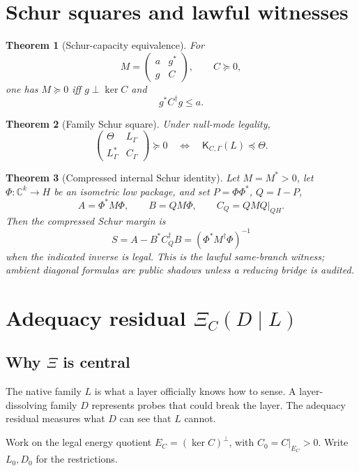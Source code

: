 \documentclass[11pt]{article}
\newtheorem{theorem}{Theorem}[section]
\newcommand{\K}{\mathsf K}
\newcommand{\Loewner}{\preceq}
\begin{document}
\section{Schur squares and lawful witnesses}

\begin{theorem}[Schur-capacity equivalence]
For
\[
  M=\begin{pmatrix}a&g^*\\ g&C\end{pmatrix},\qquad C\succeq0,
\]
one has \(M\succeq0\) iff \(g\perp\ker C\) and
\[
  g^*C^\dagger g\le a.
\]
\end{theorem}

\begin{theorem}[Family Schur square]
Under null-mode legality,
\[
  \begin{pmatrix}\Theta&L_\Gamma\\L_\Gamma^*&C_\Gamma\end{pmatrix}\succeq0
  \quad\Longleftrightarrow\quad
  \K_{C,\Gamma}(L)\Loewner\Theta.
\]
\end{theorem}

\begin{theorem}[Compressed internal Schur identity]
Let \(M=M^*>0\), let \(\Phi:\mathbb C^k\to H\) be an isometric low package, and set \(P=\Phi\Phi^*\), \(Q=I-P\),
\[
  A=\Phi^*M\Phi,\qquad B=QM\Phi,\qquad C_Q=QMQ|_{QH}.
\]
Then the compressed Schur margin is
\[
  S=A-B^*C_Q^\dagger B=(\Phi^*M^\dagger\Phi)^{-1}
\]
when the indicated inverse is legal.  This is the lawful same-branch witness; ambient diagonal formulas are public shadows unless a reducing bridge is audited.
\end{theorem}

\section{Adequacy residual \texorpdfstring{\(\Xi_C(D\mid L)\)}{Xi}}

\subsection{Why \(\Xi\) is central}
The native family \(L\) is what a layer officially knows how to sense.  A layer-dissolving family \(D\) represents probes that could break the layer.  The adequacy residual measures what \(D\) can see that \(L\) cannot.

Work on the legal energy quotient \(E_C=(\ker C)^\perp\), with \(C_0=C|_{E_C}>0\).  Write \(L_0,D_0\) for the restrictions.
\end{document}
